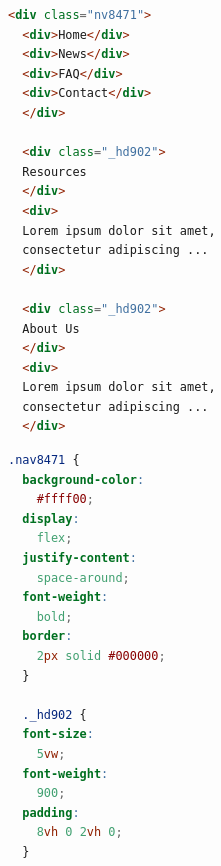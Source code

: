 \begin{figure}[h]
    \noindent
    \begin{minipage}[c]{.6\columnwidth}
        \centering
        \begin{lstlisting}[language={html},frame=ltbr,
            aboveskip=1.0em]
  <div class="nv8471">
  <div>Home</div>
  <div>News</div>
  <div>FAQ</div>
  <div>Contact</div>
  </div>
        
  <div class="_hd902">
  Resources
  </div>
  <div>
  Lorem ipsum dolor sit amet,
  consectetur adipiscing ...
  </div>
  
  <div class="_hd902">
  About Us
  </div>
  <div>
  Lorem ipsum dolor sit amet,
  consectetur adipiscing ...
  </div>
        \end{lstlisting}
    \end{minipage}
    \hfill
    \begin{minipage}[c]{.5\columnwidth}
        \centering
        \begin{lstlisting}[language={CSS},frame=ltbr,
            aboveskip=1.0em]
  .nav8471 {
  background-color:
    #ffff00;
  display:
    flex;
  justify-content:
    space-around;
  font-weight:
    bold;
  border:
    2px solid #000000;
  }
  
  ._hd902 {
  font-size:
    5vw;
  font-weight:
    900;
  padding:
    8vh 0 2vh 0;
  }
        \end{lstlisting}
    \end{minipage}
    \hfill
    \begin{minipage}[c]{.85\columnwidth}
        \centering
    \end{minipage}
  

\end{figure}
